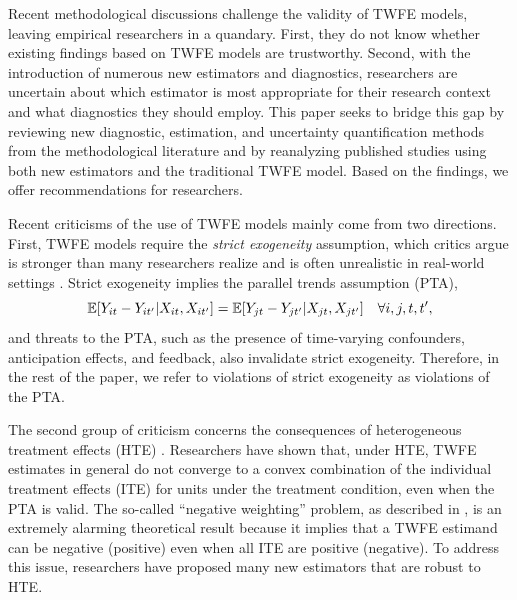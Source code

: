 \documentclass[12pt]{article}
\begin{document}
Recent methodological discussions challenge the validity of TWFE models, leaving empirical researchers in a quandary. First, they do not know whether existing findings based on TWFE models are trustworthy. Second, with the introduction of numerous new estimators and diagnostics, researchers are uncertain about which estimator is most appropriate for their research context and what diagnostics they should employ. This paper seeks to bridge this gap by reviewing new diagnostic, estimation, and uncertainty quantification methods from the methodological literature and by reanalyzing published studies using both new estimators and the traditional TWFE model. Based on the findings, we offer recommendations for researchers.

Recent criticisms of the use of TWFE models mainly come from two directions. First, TWFE models require the \textit{strict exogeneity} assumption, which critics argue is stronger than many researchers realize and is often unrealistic in real-world settings \citep{Imai2019-nw}. Strict exogeneity implies the parallel trends assumption (PTA),
\vspace{-1em}\begin{equation}\label{eq:pta} \E[Y_{it} - Y_{it'}| {X}_{it},
X_{it'}] = \E[Y_{jt} - Y_{jt'}| X_{jt}, X_{jt'}]\quad \forall i, j, t, t',
\vspace{-1em}
\end{equation}
and threats to the PTA, such as the presence of time-varying confounders, anticipation effects, and feedback, also invalidate strict exogeneity. Therefore, in the rest of the paper, we refer to violations of strict exogeneity as violations of the PTA. 

The second group of criticism concerns the consequences of heterogeneous treatment effects (HTE) \citep[e.g.,][]{Goodman-Bacon2021-xb, CDH2020, Strezhnev2018-ku, Athey2018-re, callaway2021-did,BJS2021}. Researchers have shown that, under HTE, TWFE estimates in general do not converge to a convex combination of the individual treatment effects (ITE) for units under the treatment condition, even when the PTA is valid. The so-called ``negative weighting'' problem, as described in \citet{CDH2020}, is an extremely alarming theoretical result because it implies that a TWFE estimand can be negative (positive) even when all ITE are positive (negative). To address this issue, researchers have proposed many new estimators that are robust to HTE.
\end{document}
